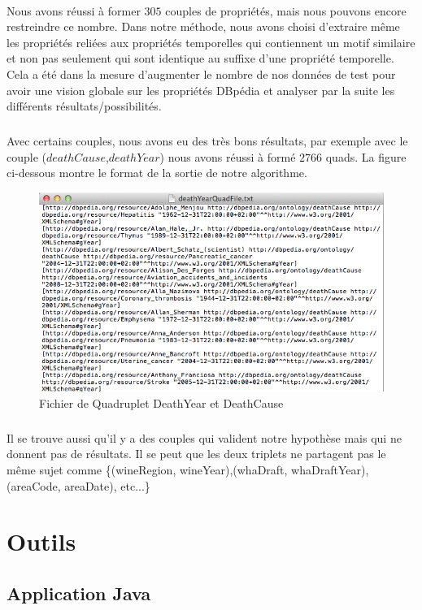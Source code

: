 \paragraph{}
Nous avons réussi à former $305$ couples de propriétés, mais nous pouvons encore restreindre ce nombre. Dans notre méthode, nous avons choisi d'extraire même les propriétés reliées aux propriétés temporelles qui contiennent un motif similaire et non pas seulement qui sont identique au suffixe d'une propriété temporelle. Cela a été dans la mesure d'augmenter le nombre de nos données de test pour avoir une vision globale sur les propriétés DBpédia et analyser par la suite les différents résultats/possibilités. 
\subparagraph{}
Avec certains couples, nous avons eu des très bons résultats, par exemple avec le couple ($deathCause$,$deathYear$) nous avons réussi à formé $2766$ quads. La figure ci-dessous montre le format de la sortie de notre algorithme.
 \begin{figure}[H]
        \centering
                \includegraphics[width=13cm]{DeathYearCause.png}
               \caption{Fichier de Quadruplet DeathYear et DeathCause}
\end{figure}
\subparagraph{}
Il se trouve aussi qu'il y a des couples qui valident notre hypothèse mais qui ne donnent pas de résultats. Il se peut que les deux triplets ne partagent pas le même sujet comme \{(wineRegion, wineYear),(whaDraft, whaDraftYear),(areaCode, areaDate), etc...\}
\section{Outils}
\subsection{Application Java}
